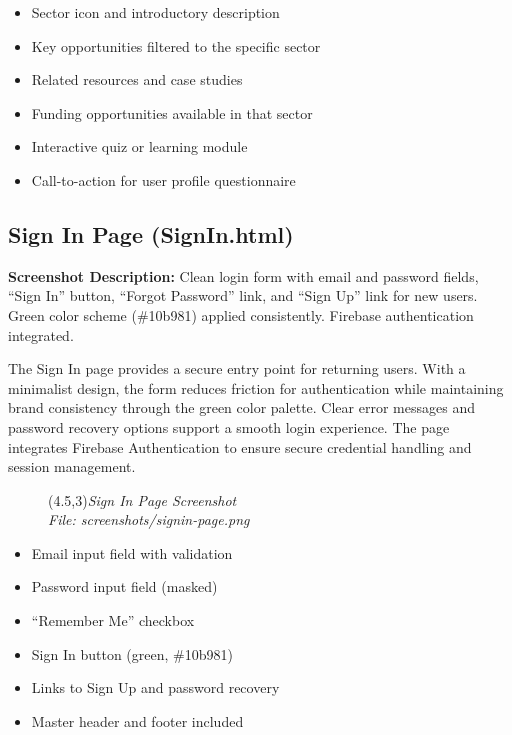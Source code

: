 \documentclass[a4paper,12pt]{article}
\begin{document}
\begin{itemize}
    \item Sector icon and introductory description
    \item Key opportunities filtered to the specific sector
    \item Related resources and case studies
    \item Funding opportunities available in that sector
    \item Interactive quiz or learning module
    \item Call-to-action for user profile questionnaire
\end{itemize}

\subsection{Sign In Page (SignIn.html)}
\textbf{Screenshot Description:} Clean login form with email and password fields, ``Sign In'' button, ``Forgot Password'' link, and ``Sign Up'' link for new users. Green color scheme (\#10b981) applied consistently. Firebase authentication integrated.

The Sign In page provides a secure entry point for returning users. With a minimalist design, the form reduces friction for authentication while maintaining brand consistency through the green color palette. Clear error messages and password recovery options support a smooth login experience. The page integrates Firebase Authentication to ensure secure credential handling and session management.

\begin{figure}[h]
    \centering
    \framebox(4.5,3){\textit{Sign In Page Screenshot}}\\
    \small\textit{File: screenshots/signin-page.png}
\end{figure}

\begin{itemize}
    \item Email input field with validation
    \item Password input field (masked)
    \item ``Remember Me'' checkbox
    \item Sign In button (green, \#10b981)
    \item Links to Sign Up and password recovery
    \item Master header and footer included
\end{itemize}
\end{document}
